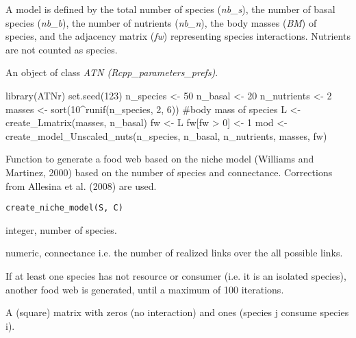 \documentclass[letterpaper]{book}
\begin{document}
%
\begin{Details}\relax
A model is defined by the total number of species
(\emph{nb\_s}), the number of basal species (\emph{nb\_b}),
the number of nutrients (\emph{nb\_n}), the body masses
(\emph{BM}) of species, and the adjacency matrix (\emph{fw})
representing species interactions.
Nutrients are not counted as species.
\end{Details}
%
\begin{Value}
An object of class \emph{ATN (Rcpp\_parameters\_prefs)}.
\end{Value}
%
\begin{Examples}
\begin{ExampleCode}
library(ATNr)
set.seed(123)
n_species <- 50
n_basal <- 20
n_nutrients <- 2
masses <- sort(10^runif(n_species, 2, 6)) #body mass of species
L <- create_Lmatrix(masses, n_basal)
fw <- L
fw[fw > 0] <- 1
mod <- create_model_Unscaled_nuts(n_species, n_basal, n_nutrients, masses, fw)
\end{ExampleCode}
\end{Examples}
%
\begin{Description}\relax
Function to generate a food web based on the niche model
(Williams and Martinez, 2000) based on the number of species and
connectance. Corrections from Allesina et al. (2008) are used.
\end{Description}
%
\begin{Usage}
\begin{verbatim}
create_niche_model(S, C)
\end{verbatim}
\end{Usage}
%
\begin{Arguments}
\begin{ldescription}
\item[\code{S}] integer, number of species.

\item[\code{C}] numeric, connectance i.e. the number of realized links over the all
possible links.
\end{ldescription}
\end{Arguments}
%
\begin{Details}\relax
If at least one species has not resource or consumer (i.e. it is an
isolated species), another food web is generated, until a maximum of 100
iterations.
\end{Details}
%
\begin{Value}
A (square) matrix with zeros (no interaction) and ones (species j
consume species i).
\end{Value}
\end{document}
